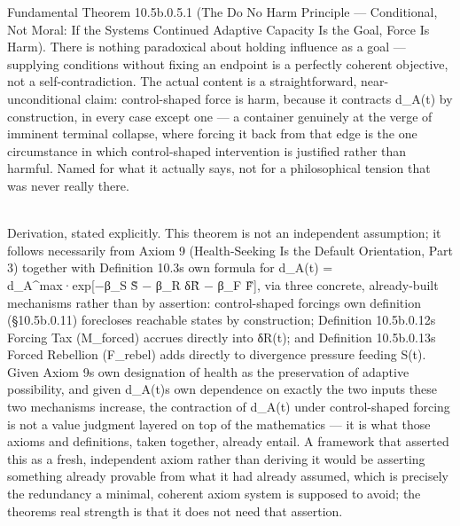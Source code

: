 \documentclass[
]{article}
\begin{document}
Fundamental Theorem 10.5b.0.5.1 (The Do No Harm Principle ---
Conditional, Not Moral: If the System\textquotesingle s Continued
Adaptive Capacity Is the Goal, Force Is Harm). There is nothing
paradoxical about holding influence as a goal --- supplying conditions
without fixing an endpoint is a perfectly coherent objective, not a
self-contradiction. The actual content is a straightforward,
near-unconditional claim: control-shaped force is harm, because it
contracts d\_A(t) by construction, in every case except one --- a
container genuinely at the verge of imminent terminal collapse, where
forcing it back from that edge is the one circumstance in which
control-shaped intervention is justified rather than harmful. Named for
what it actually says, not for a philosophical tension that was never
really there.\\
\strut \\
Derivation, stated explicitly. This theorem is not an independent
assumption; it follows necessarily from Axiom 9 (Health-Seeking Is the
Default Orientation, Part 3) together with Definition
10.3\textquotesingle s own formula for d\_A(t) = d\_A\^{}max·exp{[}−β\_S
S̃ − β\_R δR̃ − β\_F F̃{]}, via three concrete, already-built mechanisms
rather than by assertion: control-shaped forcing\textquotesingle s own
definition (§10.5b.0.11) forecloses reachable states by construction;
Definition 10.5b.0.12\textquotesingle s Forcing Tax (M\_forced) accrues
directly into δR(t); and Definition 10.5b.0.13\textquotesingle s Forced
Rebellion (F\_rebel) adds directly to divergence pressure feeding S(t).
Given Axiom 9\textquotesingle s own designation of health as the
preservation of adaptive possibility, and given
d\_A(t)\textquotesingle s own dependence on exactly the two inputs these
two mechanisms increase, the contraction of d\_A(t) under control-shaped
forcing is not a value judgment layered on top of the mathematics --- it
is what those axioms and definitions, taken together, already entail. A
framework that asserted this as a fresh, independent axiom rather than
deriving it would be asserting something already provable from what it
had already assumed, which is precisely the redundancy a minimal,
coherent axiom system is supposed to avoid; the
theorem\textquotesingle s real strength is that it does not need that
assertion.
\end{document}
